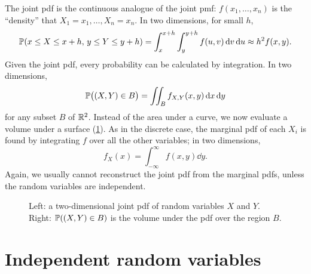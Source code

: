 The joint pdf is the continuous analogue of the joint pmf: $f(x_1, \ldots, x_n)$ is the ``density'' that $X_1 = x_1, \ldots, X_n = x_n$. In two dimensions, for small $h$,
\[
  \mathbb{P}(x \le X \le x + h, \, y \le Y \le y + h) = \int_x^{x+h} \int_y^{y+h} f(u, v) \mathop{}\!\mathrm{d} v \mathop{}\!\mathrm{d} u \approx h^2 f(x, y).
\]
Given the joint pdf, every probability can be calculated by integration. In two dimensions,
\[
  \mathbb{P}\bigl((X, Y) \in B\bigr) = \iint_{B} f_{X,Y}(x, y) \mathop{}\!\mathrm{d} x \mathop{}\!\mathrm{d} y
\]
for any subset $B$ of $\mathbb{R}^2$. Instead of the area under a curve, we now evaluate a volume under a surface (\cref{fig:joint-pdf-volume}). As in the discrete case, the marginal pdf of each $X_i$ is found by integrating $f$ over all the other variables; in two dimensions,
\[
  f_X(x) = \int_{-\infty}^\infty f(x, y) \dd y.
\]
Again, we usually cannot reconstruct the joint pdf from the marginal pdfs, unless the random variables are independent.

\begin{figure}[H]
\centering
{}
\caption{Left: a two-dimensional joint pdf of random variables $X$ and $Y$. Right: $\mathbb{P}((X, Y) \in B)$ is the volume under the pdf over the region $B$.}
\label{fig:joint-pdf-volume}
\end{figure}

\section{Independent random variables}\label{sec:independent-rvs}

